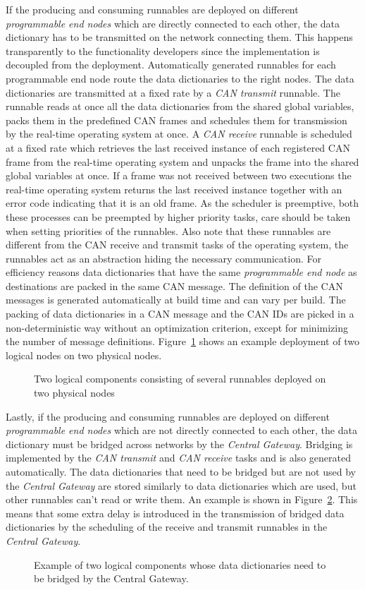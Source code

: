 If the producing and consuming runnables are deployed on different \textit{programmable end nodes} which are directly connected to each other, the data dictionary has to be transmitted on the network connecting them. This happens transparently to the functionality developers since the implementation is decoupled from the deployment. Automatically generated runnables for each programmable end node route the data dictionaries to the right nodes. The data dictionaries are transmitted at a fixed rate by a \textit{CAN transmit} runnable. The runnable reads at once all the data dictionaries from the shared global variables, packs them in the predefined CAN frames and schedules them for transmission by the real-time operating system at once. A \textit{CAN receive} runnable is scheduled at a fixed rate which retrieves the last received instance of each registered CAN frame from the real-time operating system and unpacks the frame into the shared global variables at once. If a frame was not received between two executions the real-time operating system returns the last received instance together with an error code indicating that it is an old frame. As the scheduler is preemptive, both these processes can be preempted by higher priority tasks, care should be taken when setting priorities of the runnables. Also note that these runnables are different from the CAN receive and transmit tasks of the operating system, the runnables act as an abstraction hiding the necessary communication. For efficiency reasons data dictionaries that have the same \textit{programmable end node} as destinations are packed in the same CAN message. The definition of the CAN messages is generated automatically at build time and can vary per build. The packing of data dictionaries in a CAN message and the CAN IDs are picked in a non-deterministic way without an optimization criterion, except for minimizing the number of message definitions. Figure~\ref{fig:physical_example} shows an example deployment of two logical nodes on two physical nodes.

\begin{figure}[htb]
    \centering
 \caption{Two logical components consisting of several runnables deployed on two physical nodes}
\label{fig:physical_example}
\end{figure}

Lastly, if the producing and consuming runnables are deployed on different \textit{programmable end nodes} which are not directly connected to each other, the data dictionary must be bridged across networks by the \textit{Central Gateway}. Bridging is implemented by the \textit{CAN transmit} and \textit{CAN receive} tasks and is also generated automatically. The data dictionaries that need to be bridged but are not used by the \textit{Central Gateway} are stored similarly to data dictionaries which are used, but other runnables can't read or write them. An example is shown in Figure~\ref{fig:bridging_example}. This means that some extra delay is introduced in the transmission of bridged data dictionaries by the scheduling of the receive and transmit runnables in the \textit{Central Gateway}.

\begin{figure}[h]
    \centering
 \caption{Example of two logical components whose data dictionaries need to be bridged by the Central Gateway.}
\label{fig:bridging_example}
\end{figure}